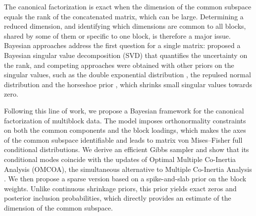\documentclass[11pt]{article}
\begin{document}
The canonical factorization is exact when the dimension of the common subspace equals the rank of the concatenated matrix, which can be large. Determining a reduced dimension, and identifying which dimensions are common to all blocks, shared by some of them or specific to one block, is therefore a major issue. Bayesian approaches address the first question for a single matrix: \cite{hoff2007} proposed a Bayesian singular value decomposition (SVD) that quantifies the uncertainty on the rank, and competing approaches were obtained with other priors on the singular values, such as the
double exponential distribution \cite{zhai2023}, the repulsed normal distribution \cite{yuchi2023} and the horseshoe prior \cite{wang2026}, which shrinks small singular values towards zero.

Following this line of work, we propose a Bayesian framework for the canonical factorization of multiblock data. The model imposes orthonormality constraints on both the common components and the block loadings, which makes the axes of the common subspace identifiable and leads to matrix von Mises--Fisher full conditional distributions. We derive an efficient Gibbs sampler and show that its conditional modes coincide with the updates of Optimal Multiple Co-Inertia Analysis (OMCOA), the simultaneous alternative to Multiple Co-Inertia Analysis \cite{chessel1996}. We then propose a sparse
version based on a spike-and-slab prior \cite{mitchell1988,george1993} on the block weights. Unlike continuous shrinkage priors, this prior yields exact zeros and posterior inclusion probabilities, which directly provides an estimate of the dimension of the common subspace.  


\end{document}
